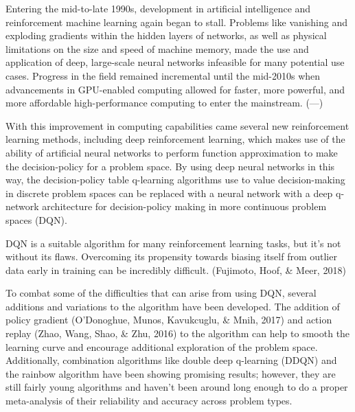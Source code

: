 Entering the mid-to-late 1990s, development in artificial intelligence and reinforcement machine learning again began to stall. Problems like vanishing and exploding gradients within the hidden layers of networks, as well as physical limitations on the size and speed of machine memory, made the use and application of deep, large-scale neural networks infeasible for many potential use cases. Progress in the field remained incremental until the mid-2010s when advancements in GPU-enabled computing allowed for faster, more powerful, and more affordable high-performance computing to enter the mainstream. (---)

With this improvement in computing capabilities came several new reinforcement learning methods, including deep reinforcement learning, which makes use of the ability of artificial neural networks to perform function approximation to make the decision-policy for a problem space. By using deep neural networks in this way, the decision-policy table q-learning algorithms use to value decision-making in discrete problem spaces can be replaced with a neural network with a deep q-network architecture for decision-policy making in more continuous problem spaces (DQN).

DQN is a suitable algorithm for many reinforcement learning tasks, but it's not without its flaws. Overcoming its propensity towards biasing itself from outlier data early in training can be incredibly difficult. (Fujimoto, Hoof, \& Meer, 2018)

To combat some of the difficulties that can arise from using DQN, 
several additions and variations to the algorithm have been developed. 
The addition of policy gradient (O'Donoghue, Munos, Kavukcuglu, \& Mnih, 2017) 
and action replay (Zhao, Wang, Shao, \& Zhu, 2016) 
to the algorithm can help to smooth the learning curve and encourage 
additional exploration of the problem space. 
Additionally, 
combination algorithms like double deep q-learning (DDQN) \cite{ddqn16} 
and the rainbow algorithm \cite{rainbow18}
have been showing promising results; however, 
they are still fairly young algorithms and haven't been around 
long enough to do a proper meta-analysis of their reliability and 
accuracy across problem types.

